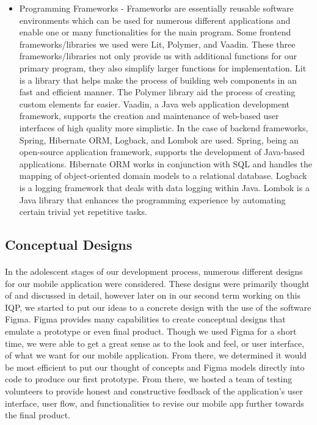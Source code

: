 \begin{itemize}
        
        \item Programming Frameworks - Frameworks are essentially reusable software environments which can be used for numerous different applications and enable one or many functionalities for the main program. Some frontend frameworks/libraries we used were Lit, Polymer, and Vaadin. These three frameworks/libraries not only provide us with additional functions for our primary program, they also simplify larger functions for implementation. Lit is a library that helps make the process of building web components in an fast and efficient manner. The Polymer library aid the process of creating custom elements far easier. Vaadin, a Java web application development framework, supports the creation and maintenance of web-based user interfaces of high quality more simplistic. In the case of backend frameworks, Spring, Hibernate ORM, Logback, and Lombok are used. Spring, being an open-source application framework, supports the development of Java-based applications. Hibernate ORM works in conjunction with SQL and handles the mapping of object-oriented domain models to a relational database. Logback is a logging framework that deals with data logging within Java. Lombok is a Java library that enhances the programming experience by automating certain trivial yet repetitive tasks.
    \end{itemize}



    \newpage
    \subsection{Conceptual Designs}  %
    
    \paragraph{}
    In the adolescent stages of our development process, numerous different designs for our mobile application were considered. These designs were primarily thought of and discussed in detail, however later on in our second term working on this IQP, we started to put our ideas to a concrete design with the use of the software Figma. Figma provides many capabilities to create conceptual designs that emulate a prototype or even final product. Though we used Figma for a short time, we were able to get a great sense as to the look and feel, or user interface, of what we want for our mobile application. From there, we determined it would be most efficient to put our thought of concepts and Figma models directly into code to produce our first prototype. From there, we hosted a team of testing volunteers to provide honest and constructive feedback of the application's user interface, user flow, and functionalities to revise our mobile app further towards the final product. 
    
